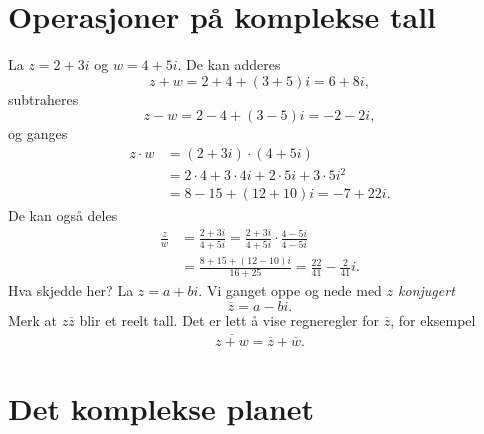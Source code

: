 \section*{Operasjoner på komplekse tall}
La $z=2+3i$ og $w=4+5i$. De kan adderes
\[
z+w=2+4+(3+5)i=6+8i,
\]
subtraheres
\[
z-w=2-4+(3-5)i=-2-2i,
\]
og ganges 
\begin{align*}
z\cdot w&=(2+3i)\cdot(4+5i)\\&=2\cdot 4+3\cdot 4i+2\cdot 5i+3\cdot 5 i^2\\&=8-15+(12+10)i=-7+22i.
\end{align*}
De kan også deles
\begin{align*}
\frac{z}{w}&=\frac{2+3i}{4+5i}=\frac{2+3i}{4+5i}\cdot\frac{4-5i}{4-5i}\\&=\frac{8+15+(12-10)i}{16+25}=\frac{22}{41}-\frac{2}{41}i.
\end{align*}
Hva skjedde her? La $z=a+bi$. 
Vi ganget oppe og nede med \emph{$z$ konjugert}
\[
\overline z =a-bi.
\]
Merk at $z\overline z$ blir et reelt tall. Det er lett å vise regneregler for $\overline z$, for eksempel
\begin{align*}
\overline{z+w}=\overline{z} + \overline{w}.
\end{align*}



\section*{Det komplekse planet}

